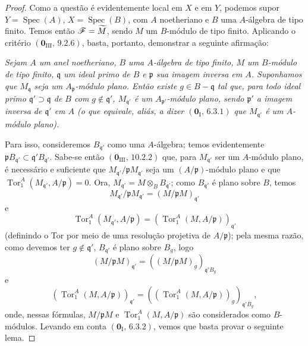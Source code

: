 \begin{proof}
Como a questão é evidentemente local em $X$ e em $Y$, podemos supor $Y=\operatorname{Spec}(A)$, $X=\operatorname{Spec}(B)$, com $A$ noetheriano e $B$ uma $A$-álgebra de tipo finito. Temos então $\mathscr{F}=\widetilde M$, sendo $M$ um $B$-módulo de tipo finito. Aplicando o critério $(\mathbf 0_{\mathrm{III}},\,9.2.6)$, basta, portanto, demonstrar a seguinte afirmação:

\begin{env}[11.1.1.1]
\label{IV.11.1.1.1}
\emph{Sejam $A$ um anel noetheriano, $B$ uma $A$-álgebra de tipo finito, $M$ um $B$-módulo de tipo finito, $\mathfrak q$ um ideal primo de $B$ e $\mathfrak p$ sua imagem inversa em $A$. Suponhamos que $M_{\mathfrak q}$ seja um $A_{\mathfrak p}$-módulo plano. Então existe $g\in B-\mathfrak q$ tal que, para todo ideal primo $\mathfrak q'\supset\mathfrak q$ de $B$ com $g\notin\mathfrak q'$, $M_{\mathfrak q'}$ é um $A_{\mathfrak p'}$-módulo plano, sendo $\mathfrak p'$ a imagem inversa de $\mathfrak q'$ em $A$ (o que equivale, aliás, a dizer $(\mathbf 0_{\mathrm I},\,6.3.1)$ que $M_{\mathfrak q'}$ é um $A$-módulo plano).}
\end{env}

Para isso, consideremos $B_{\mathfrak q'}$ como uma $A$-álgebra; temos evidentemente $\mathfrak pB_{\mathfrak q'}\subset\mathfrak q'B_{\mathfrak q'}$. Sabe-se então $(\mathbf 0_{\mathrm{III}},\,10.2.2)$ que, para $M_{\mathfrak q'}$ ser um $A$-módulo plano, é necessário e suficiente que $M_{\mathfrak q'}/\mathfrak pM_{\mathfrak q'}$ seja um $(A/\mathfrak p)$-módulo plano e que $\operatorname{Tor}_1^A(M_{\mathfrak q'},A/\mathfrak p)=0$.
Ora, $M_{\mathfrak q'}=M\otimes_BB_{\mathfrak q'}$; como $B_{\mathfrak q'}$ é plano sobre $B$, temos
\[
  M_{\mathfrak q'}/\mathfrak pM_{\mathfrak q'}
  =(M/\mathfrak pM)_{\mathfrak q'}
\]
e
\[
  \operatorname{Tor}_1^A(M_{\mathfrak q'},A/\mathfrak p)
  =(\operatorname{Tor}_1^A(M,A/\mathfrak p))_{\mathfrak q'}
\]
(definindo o Tor por meio de uma resolução projetiva de $A/\mathfrak p$); pela mesma razão, como devemos ter $g\notin\mathfrak q'$, $B_{\mathfrak q'}$ é plano sobre $B_g$, logo
\[
  (M/\mathfrak pM)_{\mathfrak q'}
  =((M/\mathfrak pM)_g)_{\mathfrak q'B_g}
\]
e
\[
  (\operatorname{Tor}_1^A(M,A/\mathfrak p))_{\mathfrak q'}
  =((\operatorname{Tor}_1^A(M,A/\mathfrak p))_g)_{\mathfrak q'B_g},
\]
onde, nessas fórmulas, $M/\mathfrak pM$ e $\operatorname{Tor}_1^A(M,A/\mathfrak p)$ são considerados como $B$-módulos. Levando em conta $(\mathbf 0_{\mathrm I},\,6.3.2)$, vemos que basta provar o seguinte lema.


\end{proof}
